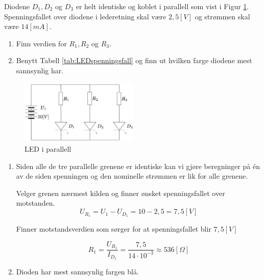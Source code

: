\begin{question}[name=Oppgave, topic=LEDdioder]
Diodene $D_1,D_2$ og $D_3$ er helt identiske og koblet i parallell som vist i Figur \ref{fig:LEDpara}. Spenningsfallet over diodene i lederetning skal være $2,5[V]$ og strømmen skal være $14 [mA]$.


\begin{enumerate}[label=\roman*)]
	\item Finn verdien for $R_1, R_2$ og $R_3$.
	\item Benytt Tabell \ref{tab:LEDspenningsfall} og finn ut hvilken farge diodene mest sannsynlig har.
\end{enumerate}


	\begin{figure}[H]
	\centering
	\includegraphics[width=0.5\textwidth]{diode/figurer/LEDparallell.png}
	\caption{LED i parallell}
	\label{fig:LEDpara}
\end{figure}
\end{question}

\vspace{0.5cm} %

\begin{solution}[name=Løsningsforslag oppgave]
	\begin{enumerate}[label=\roman*)]
		\item Siden alle de tre parallelle grenene er identiske kan vi gjøre beregninger på én av de siden spenningen og den nominelle strømmen er lik for alle grenene.
		
		Velger grenen nærmest kilden og finner ønsket spenningsfallet over motstanden.
		\[U_{R_{1}}=U_1-U_{D_{1}}=10-2,5=7,5 [V]\]
		
		Finner motstandsverdien som sørger for at spenningsfallet blir $7,5 [V]$
		
		\[R_1=\frac{U_{R_{1}}}{I_{D_{1}}}=\frac{7,5}{14 \cdot 10^{-3}} \approx 536 [\Omega] \]
		\item Dioden har mest sannsynlig fargen blå.
	\end{enumerate}
	
\end{solution}
\vspace{0.5cm} %


